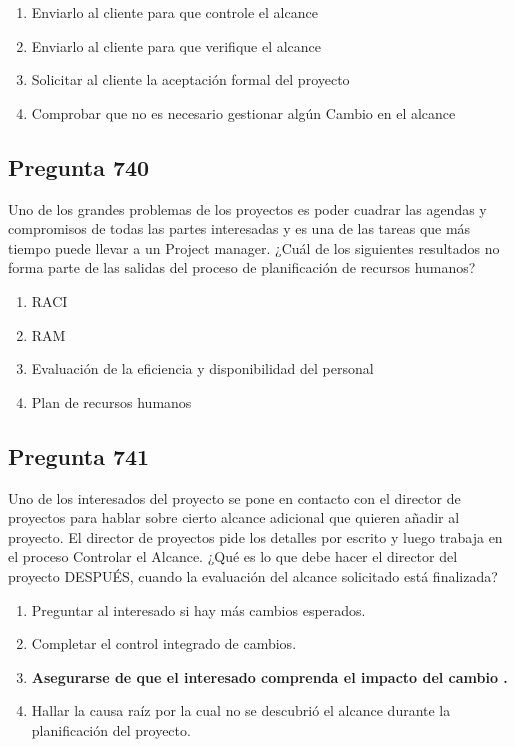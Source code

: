 \documentclass[11pt,a4paper]{article}
\begin{document}
\begin{enumerate}[label=\alph*)]
  \item Enviarlo al cliente para que controle el alcance
  \item Enviarlo al cliente para que verifique el alcance
  \item Solicitar al cliente la aceptación formal del proyecto
  \item Comprobar que no es necesario gestionar algún Cambio en el alcance
\end{enumerate}

\subsection*{Pregunta 740}
Uno de los grandes problemas de los proyectos es poder cuadrar las agendas y compromisos de todas las partes interesadas y es una de las tareas que más tiempo puede llevar a un Project manager. ¿Cuál de los siguientes resultados no forma parte de las salidas del proceso de planificación de recursos humanos?

\begin{enumerate}[label=\alph*)]
  \item RACI
  \item RAM
  \item Evaluación de la eficiencia y disponibilidad del personal
  \item Plan de recursos humanos
\end{enumerate}

\subsection*{Pregunta 741}
Uno de los interesados del proyecto se pone en contacto con el director de proyectos para hablar sobre cierto alcance adicional que quieren añadir al proyecto. El director de proyectos pide los detalles por escrito y luego trabaja en el proceso Controlar el Alcance. ¿Qué es lo que debe hacer el director del proyecto DESPUÉS, cuando la evaluación del alcance solicitado está finalizada?

\begin{enumerate}[label=\alph*)]
  \item Preguntar al interesado si hay más cambios esperados.
  \item Completar el control integrado de cambios.
  \item \textbf{Asegurarse de que el interesado comprenda el impacto del cambio .}
  \item Hallar la causa raíz por la cual no se descubrió el alcance durante la planificación del proyecto.
\end{enumerate}
\end{document}

